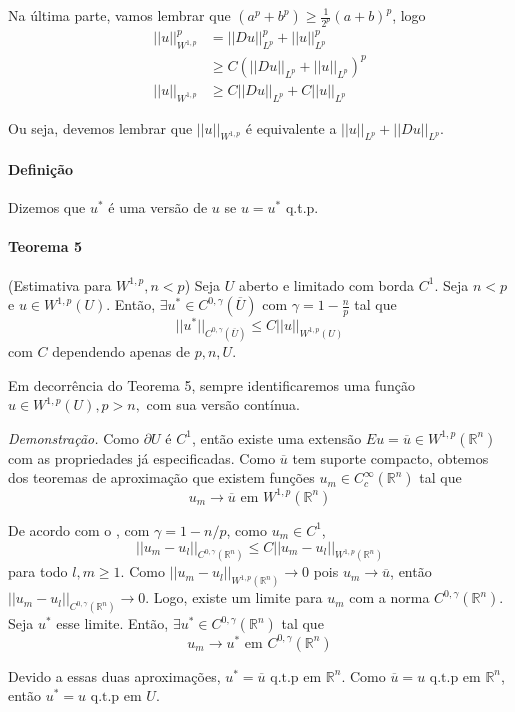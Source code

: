 \documentclass[11pt]{article}
\newcommand{\Rn}{{\mathbb{R}^n}}
\newcommand{\prn}{{(\mathbb{R}^n)}}
\newcommand{\pu}{\partial U}
\begin{document}
Na última parte, vamos lembrar que $ (a^p + b^p) \geq \frac{1}{2^p}(a+b)^p$, logo \begin{align*}
	||u||_{W^{1,p}}^p &= ||Du||_{L^p}^p + ||u||_{L^p}^p \\ &\geq C(||Du||_{L^p} + ||u||_{L^p}) ^p \\
	||u||_{W^{1,p}} &\geq C ||Du||_{L^p} + C ||u||_{L^p}
\end{align*}

Ou seja, devemos lembrar que $||u||_{W^{1,p}}$ é equivalente a $||u||_{L^p} + ||Du||_{L^p}$.


\paragraph{Definição} Dizemos que $u^*$ é uma versão de $u$ se $u=u^*$ q.t.p.


\paragraph{Teorema 5}\label{t:sobolev-ineq-t5} (Estimativa para \( W^{1,p}, n<p \)) Seja \(U\) aberto e limitado com borda \( C^1\). Seja \(  n<p \) e \(  u \in W^{1,p}(U)  \). Então, \(\exists u^* \in C^{0,\gamma}(\overline{U})\) com \( \gamma = 1 - \frac{n}{p}\) tal que \[ || u^* ||_{C^{0,\gamma}(\overline{U})} \leq C ||u||_{W^{1,p}(U)} \] com \(C\) dependendo apenas de \(p, n, U\).

Em decorrência do Teorema 5, sempre identificaremos uma função $u \in W^{1,p}(U), p>n,$ com sua versão contínua.

\textit{Demonstração.} Como $\pu$ é $C^1$, então existe uma extensão $Eu = \overline{u} \in W^{1,p}(\Rn)$ com as propriedades já especificadas. Como $\overline{u}$ tem suporte compacto, obtemos dos teoremas de aproximação que existem funções $ u_m \in C^\infty_c(\Rn) $ tal que \[ u_m \rightarrow \overline{u} \text{ em } W^{1,p}(\Rn) \]

De acordo com o , com $\gamma = 1 - n/p$, como $u_m \in C^1$, \[ ||u_m - u_l||_{C^{0,\gamma}\prn} \leq C ||u_m - u_l||_{W^{1,p}\prn} \] para todo $l,m\geq1$.  Como $||u_m - u_l||_{W^{1,p}\prn} \rightarrow 0$ pois $u_m \rightarrow \overline{u}$, então $||u_m - u_l||_{C^{0,\gamma}\prn} \rightarrow 0$. Logo, existe um limite para $u_m$ com a norma $C^{0,\gamma}\prn$. Seja $u^*$ esse limite. Então, $\exists u^* \in C^{0,\gamma}\prn$ tal que \[ u_m \rightarrow u^* \text{ em }C^{0,\gamma}\prn  \]

Devido a essas duas aproximações, $u^* = \overline{u} \text{ q.t.p em } \Rn$.  Como $\overline{u}=u \text{ q.t.p em } \Rn$, então $u^* = u \text{ q.t.p em } U$.
\end{document}
